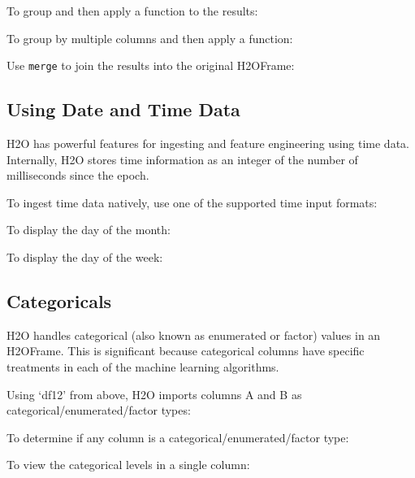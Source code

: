 {To group and then apply a function to the results:


To group by multiple columns and then apply a function:


Use {\texttt{merge}} to join the results into the original H2OFrame:


\subsection{Using Date and Time Data} 
H2O has powerful features for ingesting and feature engineering using time data.  Internally, H2O
stores time information as an integer of the number of milliseconds since the epoch.

To ingest time data natively, use one of the supported time input formats:


To display the day of the month:


To display the day of the week:


\subsection{Categoricals}
H2O handles categorical (also known as enumerated or factor) values in an H2OFrame.  This is significant because categorical
columns have specific treatments in each of the machine learning algorithms.

Using `df12' from above, H2O imports columns A and B as categorical/enumerated/factor types:


To determine if any column is a categorical/enumerated/factor type:


To view the categorical levels in a single column:


}
